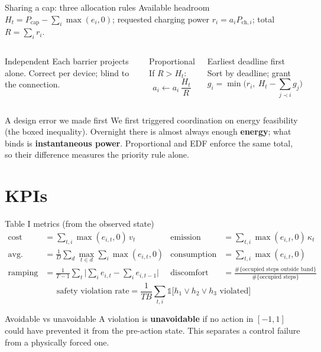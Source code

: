 \documentclass[aspectratio=169,10pt]{beamer}
\begin{document}
\begin{frame}{Sharing a cap: three allocation rules}
Available headroom $H_t = P_{\text{cap}} - \sum_i \max(e_i,0)$; requested charging power $r_i = a_i P_{\text{ch},i}$; total $R = \sum_i r_i$.
\vspace{0.3em}
\begin{columns}[T]
\begin{block}{Independent}
Each barrier projects alone. Correct per device; blind to the connection.
\end{block}
\begin{block}{Proportional}
If $R > H_t$:
\[
a_i \leftarrow a_i\,\frac{H_t}{R}
\]
\end{block}
\begin{block}{Earliest deadline first}
Sort by deadline; grant
\[
g_i = \min\Big(r_i,\ H_t - \textstyle\sum_{j \prec i} g_j\Big)
\]
\end{block}
\end{columns}
\vspace{0.4em}
\begin{alertblock}{A design error we made first}
We first triggered coordination on energy feasibility (the boxed inequality). Overnight there is almost always enough \textbf{energy}; what binds is \textbf{instantaneous power}. Proportional and EDF enforce the same total, so their difference measures the priority rule alone.
\end{alertblock}
\end{frame}

\section{KPIs}

\begin{frame}{Table I metrics (from the observed state)}
\small
\begin{align*}
\text{cost} &= \textstyle\sum_{t,i} \max(e_{i,t},0)\, v_t
&
\text{emission} &= \textstyle\sum_{t,i} \max(e_{i,t},0)\, \kappa_t\\
\text{avg.\ daily peak} &= \tfrac1D \textstyle\sum_d \max_{t\in d} \sum_i \max(e_{i,t},0)
&
\text{consumption} &= \textstyle\sum_{t,i} \max(e_{i,t},0)\\
\text{ramping} &= \tfrac{1}{T-1}\textstyle\sum_t \big|\sum_i e_{i,t} - \sum_i e_{i,t-1}\big|
&
\text{discomfort rate} &= \frac{\#\{\text{occupied steps outside band}\}}{\#\{\text{occupied steps}\}}
\end{align*}
\[
\text{safety violation rate} = \frac{1}{TB}\sum_{t,i} \mathbb 1\big[h_1 \vee h_2 \vee h_3 \text{ violated}\big]
\]
\begin{block}{Avoidable vs unavoidable}
A violation is \textbf{unavoidable} if no action in $[-1,1]$ could have prevented it from the pre-action state. This separates a control failure from a physically forced one.
\end{block}
\end{frame}
\end{document}
